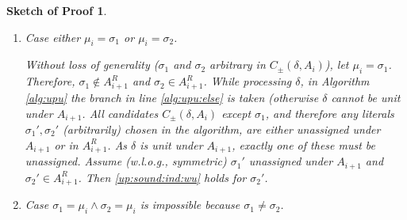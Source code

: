 \documentclass{vutinfth} %
\newtheorem{proof-sketch}{Sketch of Proof}[chapter]
\newcommand{\ass}{A}
\newcommand{\cdpm}{C_\pm}
\newcommand{\sgl}{\mu}
\newcommand{\bsgl}{\sigma}
\begin{document}
\begin{proof-sketch}
\begin{enumerate}
\begin{enumerate}
\begin{enumerate}
		$\Delta_i^\pm(\bsgl_1) = \Delta_{i+1}^\pm(\bsgl_1)$ and $\Delta_i^\pm(\bsgl_2) = \Delta_{i+1}^\pm(\bsgl_2)$, as watch sets are only modified in case $\bsgl_1 = \sgl_i$ and respectively $\bsgl_2 = \sgl_i$ (see Algorithm \ref{alg:upu}: only nogoods that are being iterated over in line \ref{alg:upu:it} are being removed from any watch sets in line \ref{alg:upu:rm}). Both $\bsgl_1$ and $\bsgl_2$ are in $A_{i+1}^R$, because $\ass_{i}^R \setminus \{ \sgl_i \} \subseteq \ass_{i+1}^R$, thus we have \ref{up:sound:ind:wu}.
		
		\item Case either $\sgl_i = \bsgl_1$ or $\sgl_i = \bsgl_2$.
		\label{sigmaprimes}		
		
		Without loss of generality ($\bsgl_1$ and $\bsgl_2$ arbitrary in $\cdpm(\delta, \ass_i)$), let $\sgl_i = \bsgl_1$. Therefore, $\bsgl_1 \not \in A_{i+1}^R$ and $\bsgl_2 \in A_{i+1}^R$. While processing $\delta$, in Algorithm \ref{alg:upu} the branch in line \ref{alg:upu:else} is taken (otherwise $\delta$ cannot be unit under $\ass_{i+1}$. All candidates $\cdpm(\delta, \ass_i)$ except $\bsgl_1$, and therefore any literals $\bsgl_1', \bsgl_2'$ (arbitrarily) chosen in the algorithm, are either unassigned under $\ass_{i+1}$ or in $\ass_{i+1}^R$. As $\delta$ is unit under $\ass_{i+1}$, exactly one of these must be unassigned.
		Assume (w.l.o.g., symmetric) $\bsgl_1'$ unassigned under $A_{i+1}$ and $\bsgl_2' \in \ass_{i+1}^R$. Then \ref{up:sound:ind:wu} holds for $\bsgl_2'$.
		
		\item Case $\bsgl_1 = \sgl_i \wedge \bsgl_2 = \sgl_i$ is impossible because $\bsgl_1 \not = \bsgl_2$.
		\end{enumerate}
\end{enumerate}


\end{enumerate}
\end{proof-sketch}
\end{document}
